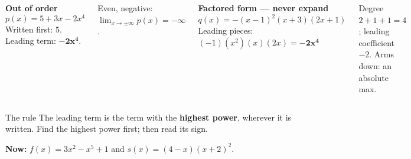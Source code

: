 \documentclass[aspectratio=169, 11pt]{beamer}
\begin{document}
\begin{frame}[t, plain]

  \begin{columns}[T]
      \textbf{Out of order}
      \[ p(x) = 5 + 3x - 2x^4 \]
      Written first: \(5\). \quad Leading term: \(\mathbf{-2x^4}\).

      \smallskip
      Even, negative: \(\displaystyle\lim_{x \to \pm\infty} p(x) = -\infty\).

      \textbf{Factored form --- never expand}
      \[ q(x) = -(x-1)^2(x+3)(2x+1) \]
      Leading pieces: \((-1)(x^2)(x)(2x) = \mathbf{-2x^4}\)

      \smallskip
      Degree \(2 + 1 + 1 = 4\); leading coefficient \(-2\). Arms down: an absolute max.
  \end{columns}

  \bigskip
  \begin{block}{The rule}
    The leading term is the term with the \textbf{highest power}, wherever it is written.
    Find the highest power first; then read its sign.
  \end{block}

  \smallskip
  \textbf{Now:} \(f(x) = 3x^2 - x^5 + 1\) \quad and \quad \(s(x) = (4 - x)(x + 2)^2\).
\end{frame}
\end{document}

